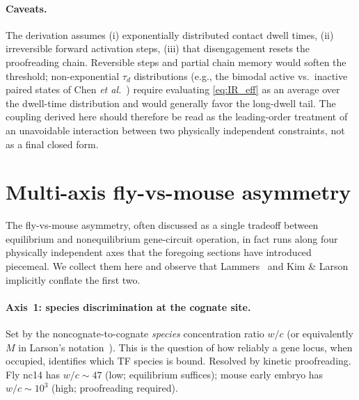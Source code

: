 \documentclass[11pt]{article}
\begin{document}
\paragraph{Caveats.} The derivation assumes (i) exponentially distributed
contact dwell times, (ii) irreversible forward activation steps, (iii)
that disengagement resets the proofreading chain. Reversible steps and
partial chain memory would soften the threshold; non-exponential
$\tau_d$ distributions (e.g., the bimodal active vs.\ inactive paired
states of Chen \textit{et al.}~\cite{Chen2018}) require evaluating
\eqref{eq:IR_eff} as an average over the dwell-time distribution and
would generally favor the long-dwell tail. The coupling derived here
should therefore be read as the leading-order treatment of an
unavoidable interaction between two physically independent constraints,
not as a final closed form.

\section{Multi-axis fly-vs-mouse asymmetry}
\label{sec:fly_vs_mouse}

The fly-vs-mouse asymmetry, often discussed as a single tradeoff between
equilibrium and nonequilibrium gene-circuit operation, in fact runs along
four physically independent axes that the foregoing sections have
introduced piecemeal. We collect them here and observe that
Lammers~\cite{Lammers2023} and Kim \& Larson~\cite{KimLarson2025}
implicitly conflate the first two.

\paragraph{Axis~1: species discrimination at the cognate site.} Set by
the noncognate-to-cognate \emph{species} concentration ratio $w/c$
\cite{Lammers2023} (or equivalently $M$ in Larson's
notation~\cite{KimLarson2025}). This is the question of how reliably a
gene locus, when occupied, identifies which TF species is bound. Resolved
by kinetic proofreading. Fly nc14 has $w/c\sim 47$ (low; equilibrium
suffices); mouse early embryo has $w/c\sim 10^{3}$ (high; proofreading
required).
\end{document}
